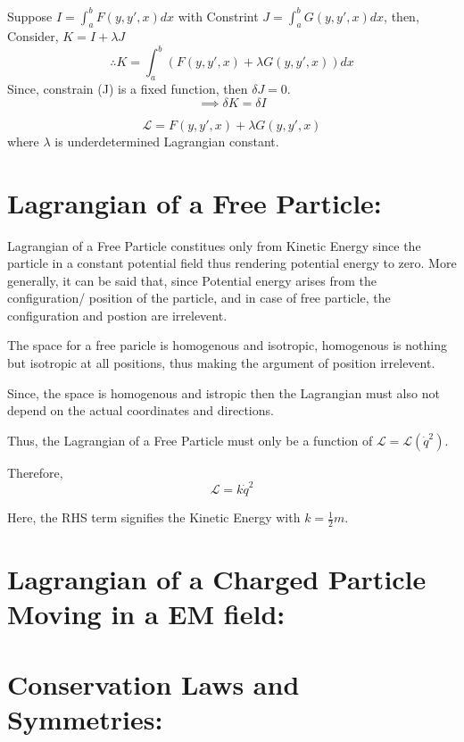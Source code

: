\documentclass[a4paper]{article}
\newcommand{\Lagr}{\mathcal{L}}
\newcommand{\half}{\frac{1}{2}}
\begin{document}
		\noindent

		Suppose $ I = \int_a^b F(y, y', x) dx $ with Constrint $ J = \int_a^b G(y, y', x) dx $, then, \hfill \\

		Consider, $ K = I + \lambda J $
		$$\therefore K = \int_a^b (F(y, y', x) + \lambda G(y, y', x)) dx $$
		Since, constrain (J) is a fixed function, then $\delta J =0 $.
		$$\implies \delta K = \delta I $$

		$$ \Lagr = F(y, y', x) + \lambda G(y, y', x) $$ where $\lambda$ is underdetermined Lagrangian constant.
	
	\section*{Lagrangian of a Free Particle: }

		Lagrangian of a Free Particle constitues only from Kinetic Energy since the particle in a constant potential field thus rendering potential energy to zero. 
		More generally, it can be said that, since Potential energy arises from the configuration/ position of the particle, and in case of free particle, the configuration and postion are irrelevent.

		The space for a free paricle is homogenous and isotropic, homogenous is nothing but isotropic at all positions, thus making the argument of position irrelevent.

		Since, the space is homogenous and istropic then the Lagrangian must also not depend on the actual coordinates and directions.

		Thus, the Lagrangian of a Free Particle must only be a function of $\Lagr = \Lagr(\dot{q}^2)$.

		Therefore, 
			$$ \Lagr = k \dot{q}^2 $$
		
		Here, the RHS term signifies the Kinetic Energy with $k=\half m$.

	\section*{Lagrangian of a Charged Particle Moving in a EM field: }


	\section*{Conservation Laws and Symmetries: }

		\noindent
\end{document}
